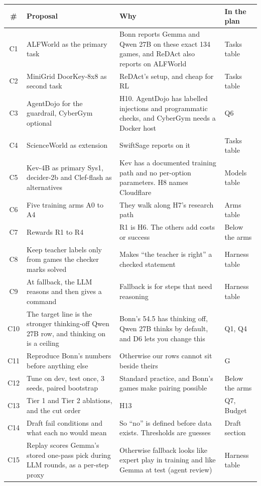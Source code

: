 \documentclass[10pt]{article}
\begin{document}
\begin{table}[H]
\footnotesize
\begin{tabularx}{\linewidth}{@{}c P{5.6cm} L P{2.2cm}@{}}
\toprule
\# & Proposal & Why & In the plan \\
\midrule
C1 & ALFWorld as the primary task & Bonn reports Gemma and Qwen 27B on these exact 134 games, and ReDAct also reports on ALFWorld & Tasks table \\
C2 & MiniGrid DoorKey-8x8 as second task & ReDAct's setup, and cheap for RL & Tasks table \\
C3 & AgentDojo for the guardrail, CyberGym optional & H10. AgentDojo has labelled injections and programmatic checks, and CyberGym needs a Docker host & Q6 \\
C4 & ScienceWorld as extension & SwiftSage reports on it & Tasks table \\
C5 & Kev-4B as primary Sys1, decider-2b and Clef-flash as alternatives & Kev has a documented training path and no per-option parameters. H8 names Cloudflare & Models table \\
C6 & Five training arms A0 to A4 & They walk along H7's research path & Arms table \\
C7 & Rewards R1 to R4 & R1 is H6. The others add costs or success & Below the arms \\
C8 & Keep teacher labels only from games the checker marks solved & Makes ``the teacher is right'' a checked statement & Harness table \\
C9 & At fallback, the LLM reasons and then gives a command & Fallback is for steps that need reasoning & Harness table \\
C10 & The target line is the stronger thinking-off Qwen 27B row, and thinking on is a ceiling & Bonn's 54.5 has thinking off, Qwen 27B thinks by default, and D6 lets you change this & Q1, Q4 \\
C11 & Reproduce Bonn's numbers before anything else & Otherwise our rows cannot sit beside theirs & G \\
C12 & Tune on dev, test once, 3 seeds, paired bootstrap & Standard practice, and Bonn's games make pairing possible & Below the arms \\
C13 & Tier 1 and Tier 2 ablations, and the cut order & H13 & Q7, Budget \\
C14 & Draft fail conditions and what each no would mean & So ``no'' is defined before data exists. Thresholds are guesses & Draft section \\
C15 & Replay scores Gemma's stored one-pass pick during LLM rounds, as a per-step proxy & Otherwise fallback looks like expert play in training and like Gemma at test (agent review) & Harness table \\

\end{tabularx}
\end{table}
\end{document}
